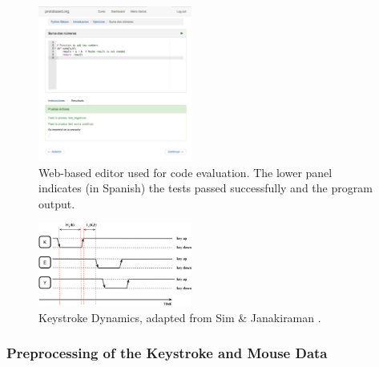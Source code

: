 \documentclass[a4paper,twoside]{article}
\begin{document}
\begin{figure}[h!tb]
\centering
\includegraphics[width=0.45\textwidth]{editorRresult.png}
\caption{Web-based editor used for code evaluation. The lower panel
  indicates (in Spanish) the tests passed successfully and the program
  output.}
\label{fig_editor}
\end{figure}

\begin{figure}[h!tb]
\centering
\includegraphics[width=0.45\textwidth]{KeyDyn.png}
\caption{Keystroke Dynamics, adapted from Sim \& Janakiraman \cite{sim2007digraphs}.}
\label{figKD}
\end{figure}

\subsubsection{Preprocessing of the Keystroke and Mouse Data}
\end{document}
